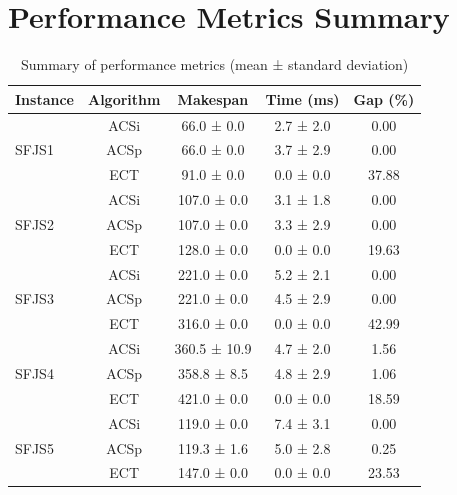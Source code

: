 \documentclass[10pt]{article}
\begin{document}
\section{Performance Metrics Summary}
\begin{table}[H]
\centering
\caption{Summary of performance metrics (mean ± standard deviation)}
\label{tab:metrics}
\begin{tabular}{lcccc}
\toprule
Instance & Algorithm & Makespan & Time (ms) & Gap (\%) \\
\midrule
\multirow{3}{*}{SFJS1} & ACSi & 66.0 ± 0.0 & 2.7 ± 2.0 & 0.00 \\
 & ACSp & 66.0 ± 0.0 & 3.7 ± 2.9 & 0.00 \\
 & ECT & 91.0 ± 0.0 & 0.0 ± 0.0 & 37.88 \\
\midrule
\multirow{3}{*}{SFJS2} & ACSi & 107.0 ± 0.0 & 3.1 ± 1.8 & 0.00 \\
 & ACSp & 107.0 ± 0.0 & 3.3 ± 2.9 & 0.00 \\
 & ECT & 128.0 ± 0.0 & 0.0 ± 0.0 & 19.63 \\
\midrule
\multirow{3}{*}{SFJS3} & ACSi & 221.0 ± 0.0 & 5.2 ± 2.1 & 0.00 \\
 & ACSp & 221.0 ± 0.0 & 4.5 ± 2.9 & 0.00 \\
 & ECT & 316.0 ± 0.0 & 0.0 ± 0.0 & 42.99 \\
\midrule
\multirow{3}{*}{SFJS4} & ACSi & 360.5 ± 10.9 & 4.7 ± 2.0 & 1.56 \\
 & ACSp & 358.8 ± 8.5 & 4.8 ± 2.9 & 1.06 \\
 & ECT & 421.0 ± 0.0 & 0.0 ± 0.0 & 18.59 \\
\midrule
\multirow{3}{*}{SFJS5} & ACSi & 119.0 ± 0.0 & 7.4 ± 3.1 & 0.00 \\
 & ACSp & 119.3 ± 1.6 & 5.0 ± 2.8 & 0.25 \\
 & ECT & 147.0 ± 0.0 & 0.0 ± 0.0 & 23.53 \\
\midrule
\bottomrule
\end{tabular}
\end{table}
\end{document}
